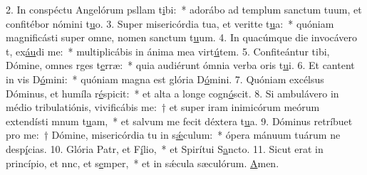 2. In conspéctu Angelórum psllam t\uline{i}bi:~* adorábo ad templum sanctum tuum, et confitébor nómini t\uline{u}o.
3. Super misericórdia tua, et veritte t\uline{u}a:~* quóniam magnificásti super omne, nomen sanctum t\uline{u}um.
4. In quacúmque die invocávero t, ex\uline{áu}di me:~* multiplicábis in ánima mea virt\uline{ú}tem.
5. Confiteántur tibi, Dómine, omnes rges t\uline{e}rræ:~* quia audiérunt ómnia verba oris t\uline{u}i.
6. Et cantent in vis D\uline{ó}mini:~* quóniam magna est glória D\uline{ó}mini.
7. Quóniam excélsus Dóminus, et humíla r\uline{é}spicit:~* et alta a longe cogn\uline{ó}scit.
8. Si ambulávero in médio tribulatiónis, vivificábis me:~† et super iram inimicórum meórum extendísti mnum t\uline{u}am,~* et salvum me fecit déxtera t\uline{u}a.
9. Dóminus retríbuet pro me:~† Dómine, misericórdia tu in s\uline{ǽ}culum:~* ópera mánuum tuárum ne desp\uline{í}cias.
10. Glória Patr, et F\uline{í}lio,~* et Spirítui S\uline{a}ncto.
11. Sicut erat in princípio, et nnc, et s\uline{e}mper,~* et in sǽcula sæculórum. \uline{A}men.

